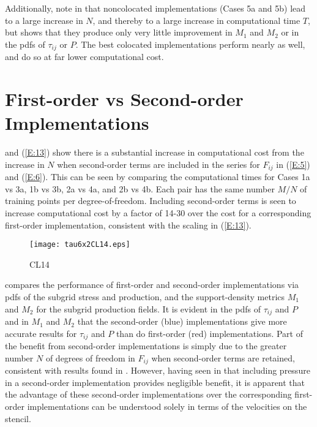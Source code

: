 Additionally, note in  that noncolocated implementations (Cases 5a and 5b) lead to a large increase in $N$, and thereby to a large increase in computational time $T$, but  shows that they produce only very little improvement in  $M_1$ and $M_2$  or in the pdfs of  $\tau_{ij}$ or $P$. The best colocated implementations perform nearly as well, and do so at far lower computational cost.

\section{First-order vs Second-order Implementations}
\label{sec:IVD}

 and (\ref{E:13}) show there is a substantial increase in computational cost from the increase in $N$ when second-order terms are included in the  series for  $F_{ij}$ in (\ref{E:5}) and (\ref{E:6}). This can be seen by comparing the computational times for Cases 1a vs 3a, 1b vs 3b, 2a vs 4a, and 2b vs 4b. Each pair has the same number  $M/N$ of training points per degree-of-freedom. Including second-order terms is seen to increase computational cost by a factor of 14-30 over the cost for a corresponding first-order implementation, consistent with the scaling in (\ref{E:13}).  


%
\begin{figure}
	\begin{center}
	\texttt{[image: tau6x2CL14.eps]}
	\caption{CL14}
	\label{F:CL14}
	\end{center}
\end{figure}
%
%

 compares the performance of first-order and second-order implementations via pdfs of the subgrid stress and production, and the support-density metrics  $M_1$ and $M_2$ for the subgrid production fields. It is evident in the pdfs of  $\tau_{ij}$ and $P$ and in $M_1$   and $M_2$  that the second-order (blue) implementations give more accurate results for  $\tau_{ij}$ and $P$ than do first-order (red) implementations. Part of the benefit from second-order implementations is simply due to the greater number $N$ of degrees of freedom in  $F_{ij}$ when second-order terms are retained, consistent with results found in . However, having seen in   that including pressure in a second-order implementation provides negligible benefit, it is apparent that the advantage of these second-order implementations over the corresponding first-order implementations can be understood solely in terms of the velocities on the stencil. 

